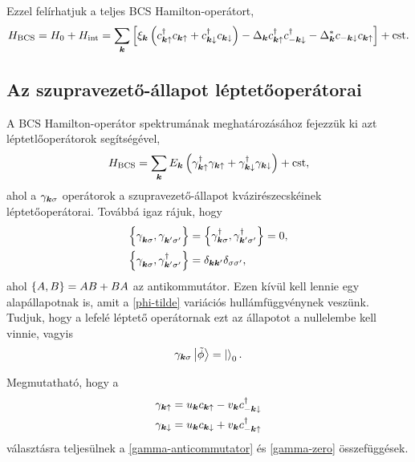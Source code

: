 \documentclass[a4paper,12pt,titlepage]{article}
\newcommand{\KK}{{\vb*{k}}}
\newcommand{\phantomdagger}{{\phantom{\dagger}}}
\begin{document}
Ezzel felírhatjuk a teljes BCS Hamilton-operátort,
\begin{equation}
	H_\text{BCS} = H_0 + H_\text{int} = \sum\limits_\KK \left[ \xi_\KK \left( c_{\KK \uparrow}^\dagger c_{\KK \uparrow} + c_{\KK \downarrow}^\dagger c_{\KK \downarrow} \right) - \Delta_\KK c_{\KK \uparrow}^\dagger c_{-\KK \downarrow}^\dagger - \Delta_\KK^* c_{-\KK \downarrow} c_{\KK \uparrow} \right] + \text{cst}.
\end{equation}


\subsection{Az szupravezető-állapot léptetőoperátorai}

A BCS Hamilton-operátor spektrumának meghatározásához fejezzük ki azt léptetlőoperátorok segítségével,
\begin{equation} \label{H-BCS}
	H_\text{BCS} = \sum\limits_\KK E_\KK \left( \gamma_{\KK \uparrow}^\dagger \gamma_{\KK \uparrow} + \gamma_{\KK \downarrow}^\dagger \gamma_{\KK \downarrow} \right) + \text{cst},
\end{equation}
ahol a $\gamma_{\KK \sigma}$ operátorok a szupravezető-állapot kvázirészecskéinek léptetőoperátorai.  Továbbá igaz rájuk, hogy
\begin{equation} \label{gamma-anticommutator}
\begin{split}
	\anticommutator{\gamma_{\KK \sigma}^\phantomdagger}{\gamma_{\KK^\prime \sigma^\prime}^\phantomdagger} & = \anticommutator{\gamma_{\KK \sigma}^\dagger}{\gamma_{\KK^\prime \sigma^\prime}^\dagger} = 0, \\
	\anticommutator{\gamma_{\KK \sigma}^\phantomdagger}{\gamma_{\KK^\prime \sigma^\prime}^\dagger} & = \delta_{\KK \KK^\prime} \delta_{\sigma \sigma^\prime},
\end{split}
\end{equation}
ahol $\anticommutator{A}{B} = AB + BA$ az antikommutátor.  Ezen kívül kell lennie egy alapállapotnak is, amit a \eqref{phi-tilde} variációs hullámfüggvénynek veszünk.  Tudjuk, hogy a lefelé léptető operátornak ezt az állapotot a nullelembe kell vinnie, vagyis
\begin{equation} \label{gamma-zero}
	\gamma_{\KK \sigma} \ket{\tilde{\phi}} = \ket{}_0.
\end{equation}

Megmutatható, hogy a
\begin{equation}
\begin{split}
	\gamma_{\KK \uparrow} & = u_\KK c_{\KK \uparrow} - v_\KK c_{-\KK \downarrow}^\dagger \\
	\gamma_{\KK \downarrow} & = u_\KK c_{\KK \downarrow} + v_\KK c_{-\KK \uparrow}^\dagger
\end{split}
\end{equation}
választásra teljesülnek a \eqref{gamma-anticommutator} és \eqref{gamma-zero} összefüggések.
\end{document}
